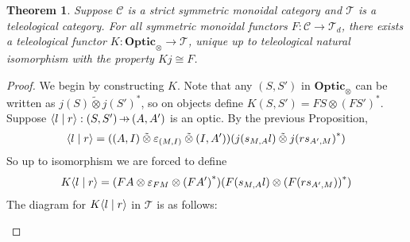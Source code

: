 \documentclass[11pt,letterpaper]{article}
\theoremstyle{plain}
\newtheorem{theorem}{Theorem}[subsection]
\theoremstyle{definition}
\newcommand{\C}{\mathscr{C}}
\newcommand{\T}{\mathscr{T}}
\newcommand{\Optic}{\mathbf{Optic}}
\newcommand{\switched}{\mathbin{\tilde{\otimes}}}
\newcommand{\rep}[2]{{\ensuremath \left\langle #1 \mid #2 \right\rangle}}
\newcommand{\hto}{\ensuremath{\,\mathaccent\shortmid\rightarrow\,}}
\begin{document}
\begin{theorem}\label{optic-is-free-teleological-cat}
  Suppose $\C$ is a strict symmetric monoidal category and $\T$ is a teleological category. For all symmetric monoidal functors $F : \C \to \T_d$, there exists a teleological functor $K : \Optic_\otimes \to \T$, unique up to teleological natural isomorphism with the property $Kj \cong F$.
\end{theorem}
\begin{proof}
  We begin by constructing $K$. Note that any $(S, S')$ in $\Optic_\otimes$ can be written as $j(S) \switched {j(S')}^*$, so on objects define $K(S, S') = FS \otimes {(FS')}^*$. Suppose $\rep{l}{r} : (S, S') \hto (A, A')$ is an optic. By the previous Proposition,
  \begin{align*}
    \rep{l}{r} = ((A, I) \switched \varepsilon_{(M, I)} \switched (I, A'))(j(s_{M,A}l) \switched {j(rs_{A', M})}^*)
  \end{align*}
  So up to isomorphism we are forced to define
  \begin{align*}
    K\rep{l}{r} = (FA \otimes \varepsilon_{FM} \otimes {(FA')}^*)(F(s_{M,A}l) \otimes {(F(rs_{A', M}))}^* )
  \end{align*}
  The diagram for $K\rep{l}{r}$ in $\T$ is as follows:
  \begin{center}
    
  \end{center}



\end{proof}
\end{document}
